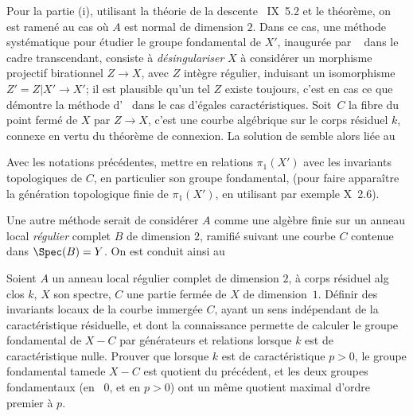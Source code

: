 Pour la partie (i), utilisant la th\'eorie de la descente ~IX~5.2 et le th\'eor\`eme, on est ramen\'e au cas o\`u $A$ est normal de dimension $2$. Dans ce cas, une m\'ethode syst\'ematique pour \'etudier le groupe fondamental de $X'$, inaugur\'ee par ~\cite{XIII.5} dans le cadre transcendant, consiste \`a \emph{d\'esingulariser} $X$ \ie \`a consid\'erer un morphisme projectif birationnel $Z\to X$, avec $Z$ int\`egre r\'egulier, induisant un isomorphisme $Z'=Z|X'\to X'$; il est plausible qu'un tel $Z$ existe toujours, c'est en  cas ce que d\'emontre la m\'ethode d'~\cite{XIII.1} dans le cas d'\og \'egales caract\'eristiques{\fg}. Soit~$C$ la fibre du point ferm\'e de $X$ par $Z\to X$, c'est une courbe alg\'ebrique sur le corps r\'esiduel $k$, connexe en vertu du th\'eor\`eme de connexion. La solution de  semble alors li\'ee au

\begin{probleme} \label{XIII.3.2}
Avec les notations pr\'ec\'edentes, mettre en relations $\pi_1(X')$ avec les invariants topologiques de $C$, en particulier son groupe fondamental, (pour faire appara\^itre la g\'en\'eration topologique finie de $\pi_1(X')$, en utilisant par exemple \SGA {}\textup{X~2.6}).
\end{probleme}

Une autre m\'ethode serait de consid\'erer $A$ comme une alg\`ebre finie sur un anneau local \emph{r\'egulier} complet $B$ de dimension $2$, ramifi\'e suivant une courbe $C$ contenue dans $\Spec(B)=Y$. On est conduit ainsi au

\begin{probleme} \label{XIII.3.3}
Soient $A$ un anneau local r\'egulier complet de dimension $2$, \`a corps r\'esiduel alg clos $k$, $X$ son spectre, $C$ une partie ferm\'ee de $X$ de dimension~$1$. D\'efinir des invariants locaux de la courbe immerg\'ee $C$, ayant un sens ind\'ependant de la caract\'eristique r\'esiduelle, et dont la connaissance permette de calculer le groupe fondamental de $X-C$ par g\'en\'erateurs et relations lorsque $k$ est de caract\'eristique nulle. Prouver que lorsque $k$ est de caract\'eristique $p> 0$, le groupe fondamental \og tame\fg de $X-C$ est quotient du pr\'ec\'edent, et les deux groupes fondamentaux (en ~$0$, et en  $p> 0$) ont un m\^eme quotient maximal d'ordre premier \`a $p$.
\end{probleme}

